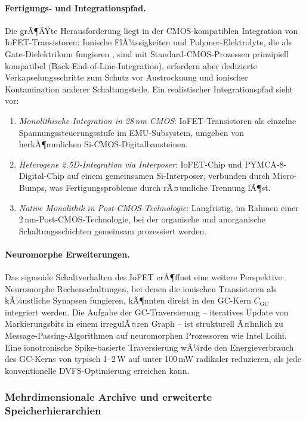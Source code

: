 ﻿\documentclass[a4paper,12pt]{scrreprt}
\theoremstyle{definition}
\begin{document}
	\paragraph{Fertigungs- und Integrationspfad.}
	Die grÃ¶ÃŸte Herausforderung liegt in der CMOS-kompatiblen Integration von
	IoFET-Transistoren: Ionische FlÃ¼ssigkeiten und Polymer-Elektrolyte, die als
	Gate-Dielektrikum fungieren \cite{epp2026iono}, sind mit Standard-CMOS-Prozessen
	prinzipiell kompatibel (Back-End-of-Line-Integration), erfordern aber dedizierte
	Verkapselungsschritte zum Schutz vor Austrocknung und ionischer Kontamination
	anderer Schaltungsteile. Ein realistischer Integrationspfad sieht vor:
	\begin{enumerate}[noitemsep]
		\item \emph{Monolithische Integration in 28\,nm CMOS}: IoFET-Transistoren
		als einzelne Spannungssteuerungsstufe im EMU-Subsystem, umgeben von
		herkÃ¶mmlichen Si-CMOS-Digitalbausteinen.
		\item \emph{Heterogene 2.5D-Integration via Interposer}: IoFET-Chip und
		PYMCA-8-Digital-Chip auf einem gemeinsamen Si-Interposer, verbunden durch
		Micro-Bumps, was Fertigungsprobleme durch rÃ¤umliche Trennung lÃ¶st.
		\item \emph{Native Monolithik in Post-CMOS-Technologie}: Langfristig, im
		Rahmen einer 2\,nm-Post-CMOS-Technologie, bei der organische und
		anorganische Schaltungsschichten gemeinsam prozessiert werden.
	\end{enumerate}

	\paragraph{Neuromorphe Erweiterungen.}
	Das sigmoide Schaltverhalten des IoFET erÃ¶ffnet eine weitere Perspektive:
	Neuromorphe Rechenschaltungen, bei denen die ionischen Transistoren als
	kÃ¼nstliche Synapsen fungieren, kÃ¶nnten direkt in den GC-Kern $C_{\mathrm{GC}}$
	integriert werden. Die Aufgabe der GC-Traversierung -- iteratives Update von
	Markierungsbits in einem irregulÃ¤ren Graph -- ist strukturell Ã¤hnlich zu
	Message-Passing-Algorithmen auf neuromorphen Prozessoren wie Intel Loihi.
	Eine ionotronische Spike-basierte Traversierung wÃ¼rde den Energieverbrauch
	des GC-Kerns von typisch 1--2\,W auf unter 100\,mW radikaler reduzieren,
	als jede konventionelle DVFS-Optimierung erreichen kann.

	\subsubsection{Mehrdimensionale Archive und erweiterte Speicherhierarchien}
\end{document}
